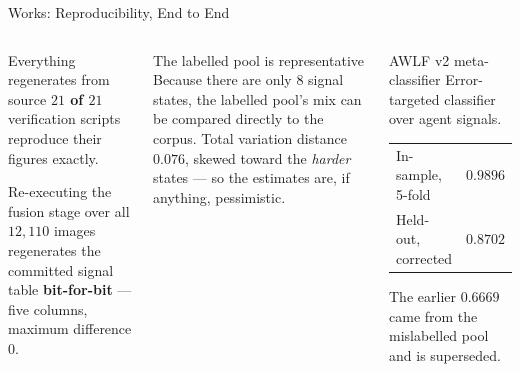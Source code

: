 \documentclass[aspectratio=169,11pt]{beamer}
\begin{document}
\begin{frame}{Works: Reproducibility, End to End}
\begin{columns}[T]
\begin{exampleblock}{\small Everything regenerates from source}
\footnotesize \textbf{$21$ of $21$} verification scripts reproduce their figures exactly.
\vspace{1mm}

Re-executing the fusion stage over all $12{,}110$ images regenerates the committed signal table \textbf{bit-for-bit} --- five columns, maximum difference $0$.
\end{exampleblock}
\vspace{1mm}
\begin{block}{\small The labelled pool is representative}
\footnotesize Because there are only 8 signal states, the labelled pool's mix can be compared directly to the corpus. Total variation distance \textbf{$0.076$}, skewed toward the \emph{harder} states --- so the estimates are, if anything, pessimistic.
\end{block}

\begin{exampleblock}{\small AWLF v2 meta-classifier}
\footnotesize Error-targeted classifier over agent signals.
\vspace{1mm}
\begin{center}
\begin{tabular}{@{}l r@{}}
In-sample, 5-fold & $0.9896$ \\
Held-out, corrected & $\mathbf{0.8702}$ \\
\end{tabular}
\end{center}
\vspace{1mm}
The earlier $0.6669$ came from the mislabelled pool and is superseded.
\end{exampleblock}
\end{columns}
\end{frame}
\end{document}
